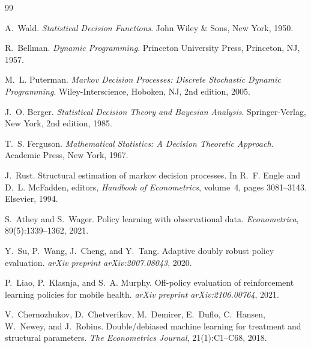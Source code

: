 \documentclass[11pt,a4paper]{article}
\theoremstyle{mitheorem}
\theoremstyle{mitdef}
\begin{document}
\begin{thebibliography}{99}

A.~Wald.
\newblock \emph{Statistical Decision Functions}.
\newblock John Wiley \& Sons, New York, 1950.

R.~Bellman.
\newblock \emph{Dynamic Programming}.
\newblock Princeton University Press, Princeton, NJ, 1957.

M.~L. Puterman.
\newblock \emph{Markov Decision Processes: Discrete Stochastic Dynamic
  Programming}.
\newblock Wiley-Interscience, Hoboken, NJ, 2nd edition, 2005.

J.~O. Berger.
\newblock \emph{Statistical Decision Theory and Bayesian Analysis}.
\newblock Springer-Verlag, New York, 2nd edition, 1985.

T.~S. Ferguson.
\newblock \emph{Mathematical Statistics: A Decision Theoretic Approach}.
\newblock Academic Press, New York, 1967.

J.~Rust.
\newblock Structural estimation of markov decision processes.
\newblock In R.~F. Engle and D.~L. McFadden, editors, \emph{Handbook of
  Econometrics}, volume~4, pages 3081--3143. Elsevier, 1994.

S.~Athey and S.~Wager.
\newblock Policy learning with observational data.
\newblock \emph{Econometrica}, 89(5):1339--1362, 2021.

Y.~Su, P.~Wang, J.~Cheng, and Y.~Tang.
\newblock Adaptive doubly robust policy evaluation.
\newblock \emph{arXiv preprint arXiv:2007.08043}, 2020.

P.~Liao, P.~Klasnja, and S.~A. Murphy.
\newblock Off-policy evaluation of reinforcement learning policies for mobile
  health.
\newblock \emph{arXiv preprint arXiv:2106.00764}, 2021.

V.~Chernozhukov, D.~Chetverikov, M.~Demirer, E.~Duflo, C.~Hansen, W.~Newey,
  and J.~Robins.
\newblock Double/debiased machine learning for treatment and structural
  parameters.
\newblock \emph{The Econometrics Journal}, 21(1):C1--C68, 2018.


\end{thebibliography}
\end{document}
